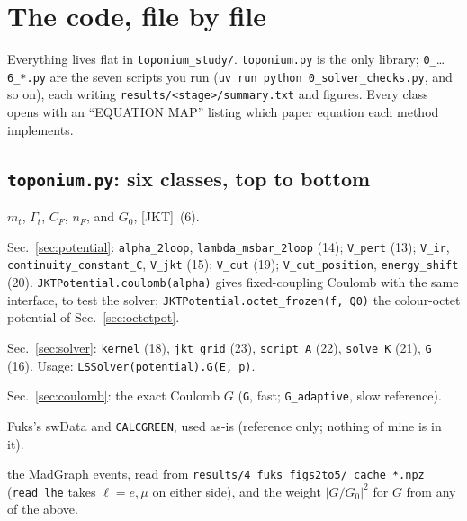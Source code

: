 \documentclass[11pt]{article}
\newcommand{\code}[1]{\texttt{#1}}
\newcommand{\Gt}{\Gamma_t}
\newcommand{\JKT}{[JKT]}
\begin{document}
\appendix
\section{The code, file by file}
\label{sec:files}
\begingroup\sloppy

Everything lives flat in \code{toponium\_study/}. \code{toponium.py} is the only library; \code{0\_}\ldots\code{6\_*.py} are the
seven scripts you run (\code{uv run python 0\_solver\_checks.py}, and so on), each writing \code{results/<stage>/summary.txt} and
figures. Every class opens with an ``EQUATION MAP'' listing which paper equation each method implements.

\subsection*{\code{toponium.py}: six classes, top to bottom}
\begin{description}[style=nextline,leftmargin=1.2em]
\item[\code{Constants}] $m_t$, $\Gt$, $C_F$, $n_F$, and $G_0$, \JKT\ (6).
\item[\code{JKTPotential}] Sec.~\ref{sec:potential}: \code{alpha\_2loop}, \code{lambda\_msbar\_2loop} (14); \code{V\_pert} (13);
  \code{V\_ir}, \code{continuity\_constant\_C}, \code{V\_jkt} (15); \code{V\_cut} (19); \code{V\_cut\_position}, \code{energy\_shift} (20).
  \code{JKTPotential.coulomb(alpha)} gives fixed-coupling Coulomb with the same interface, to test the solver;
  \code{JKTPotential.octet\_frozen(f, Q0)} the colour-octet potential of Sec.~\ref{sec:octetpot}.
\item[\code{LSSolver}] Sec.~\ref{sec:solver}: \code{kernel} (18), \code{jkt\_grid} (23), \code{script\_A} (22), \code{solve\_K} (21),
  \code{G} (16). Usage: \code{LSSolver(potential).G(E, p)}.
\item[\code{CoulombExact}] Sec.~\ref{sec:coulomb}: the exact Coulomb $G$ (\code{G}, fast; \code{G\_adaptive}, slow reference).
\item[\code{FuksTables}] Fuks's swData and \code{CALCGREEN}, used as-is (reference only; nothing of mine is in it).
\item[\code{Events}] the MadGraph events, read from \code{results/4\_fuks\_figs2to5/\_cache\_*.npz} (\code{read\_lhe} takes $\ell=e,\mu$ on
  either side), and the weight $|G/G_0|^2$ for $G$ from any of the above.
\end{description}
\end{document}
